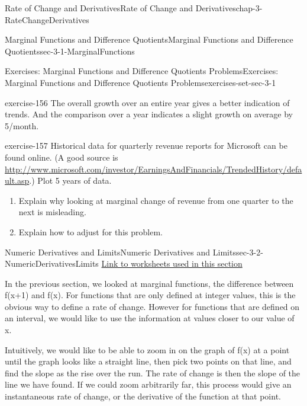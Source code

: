 \documentclass[oneside,10pt,]{book}
\numberwithin{equation}{section}
\begin{document}
\begin{chapterptx}{Rate of Change and Derivatives}{}{Rate of Change and Derivatives}{}{}{chap-3-RateChangeDerivatives}
\begin{sectionptx}{Marginal Functions and Difference Quotients}{}{Marginal Functions and Difference Quotients}{}{}{sec-3-1-MarginalFunctions}
\begin{exercises-subsection-numberless}{Exercises: Marginal Functions and Difference Quotients Problems}{}{Exercises: Marginal Functions and Difference Quotients Problems}{}{}{exercises-set-sec-3-1}
\begin{divisionexercise}{17}{}{}{exercise-156}
The overall growth over an entire year gives a better indication of trends. And the comparison over a year indicates a slight growth on average by \textdollar{}5\slash{}month.%
\end{divisionexercise}%
\begin{divisionexercise}{18}{}{}{exercise-157}%
\hypertarget{p-1011}{}%
Historical data for quarterly revenue reports for Microsoft can be found online.  (A good source is \href{http://www.microsoft.com/investor/EarningsAndFinancials/TrendedHistory/default.aspx}{http:\slash{}\slash{}www.microsoft.com\slash{}investor\slash{}EarningsAndFinancials\slash{}TrendedHistory\slash{}default.asp}.) Plot 5 years of data.\leavevmode%
\begin{enumerate}[label=(\alph*)]
\item\hypertarget{li-315}{}\hypertarget{p-1012}{}%
Explain why looking at marginal change of revenue from one quarter to the next is misleading.%
\item\hypertarget{li-316}{}\hypertarget{p-1013}{}%
Explain how to adjust for this problem.%
\end{enumerate}
%
\end{divisionexercise}%
\end{exercises-subsection-numberless}
\end{sectionptx}
%
%
\typeout{************************************************}
\typeout{************************************************}
%
\begin{sectionptx}{Numeric Derivatives and Limits}{}{Numeric Derivatives and Limits}{}{}{sec-3-2-NumericDerivativesLimits}
\hypertarget{p-1014}{}%
\href{./Examples/Section-3-2-Examples.xlsx}{Link to worksheets used in this section}%
\par
\hypertarget{p-1015}{}%
In the previous section, we looked at marginal functions, the difference between f(x+1) and f(x).  For functions that are only defined at integer values, this is the obvious way to define a rate of change.  However for functions that are defined on an interval, we would like to use the information at values closer to our value of x.%
\par
\hypertarget{p-1016}{}%
Intuitively, we would like to be able to zoom in on the graph of f(x) at a point until the graph looks like a straight line, then pick two points on that line, and find the slope as the rise over the run.  The rate of change is then the slope of the line we have found.  If we could zoom arbitrarily far, this process would give an instantaneous rate of change, or the derivative of the function at that point.%

\end{sectionptx}
\end{chapterptx}
\end{document}
